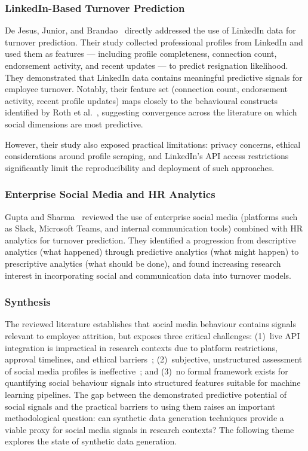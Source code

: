 \documentclass[12pt,a4paper]{article}
\begin{document}
\subsubsection{LinkedIn-Based Turnover Prediction}

De Jesus, Junior, and Brandao~\cite{dejesus2018linkedin} directly addressed the use of LinkedIn data for turnover prediction. Their study collected professional profiles from LinkedIn and used them as features --- including profile completeness, connection count, endorsement activity, and recent updates --- to predict resignation likelihood. They demonstrated that LinkedIn data contains meaningful predictive signals for employee turnover. Notably, their feature set (connection count, endorsement activity, recent profile updates) maps closely to the behavioural constructs identified by Roth et al.~\cite{roth2016socialmedia}, suggesting convergence across the literature on which social dimensions are most predictive.

However, their study also exposed practical limitations: privacy concerns, ethical considerations around profile scraping, and LinkedIn's API access restrictions significantly limit the reproducibility and deployment of such approaches.

\subsubsection{Enterprise Social Media and HR Analytics}

Gupta and Sharma~\cite{gupta2022hr} reviewed the use of enterprise social media (platforms such as Slack, Microsoft Teams, and internal communication tools) combined with HR analytics for turnover prediction. They identified a progression from descriptive analytics (what happened) through predictive analytics (what might happen) to prescriptive analytics (what should be done), and found increasing research interest in incorporating social and communication data into turnover models.

\subsubsection{Synthesis}

The reviewed literature establishes that social media behaviour contains signals relevant to employee attrition, but exposes three critical challenges: (1)~live API integration is impractical in research contexts due to platform restrictions, approval timelines, and ethical barriers~\cite{dejesus2018linkedin}; (2)~subjective, unstructured assessment of social media profiles is ineffective~\cite{vaniddekinge2016facebook}; and (3)~no formal framework exists for quantifying social behaviour signals into structured features suitable for machine learning pipelines. The gap between the demonstrated predictive potential of social signals and the practical barriers to using them raises an important methodological question: can synthetic data generation techniques provide a viable proxy for social media signals in research contexts? The following theme explores the state of synthetic data generation.
\end{document}
